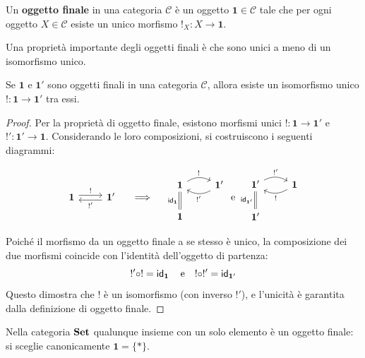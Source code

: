 \begin{definition}
  Un \textbf{oggetto finale} in una categoria \(\mathcal{C}\) è un oggetto \(\mathbf{1} \in \mathcal{C}\) tale che per ogni oggetto \(X \in \mathcal{C}\) esiste un unico morfismo \(!_X : X \to \mathbf{1}\).
\end{definition}

Una proprietà importante degli oggetti finali è che sono unici a meno di un isomorfismo unico.

\begin{proposition}
  Se \(\mathbf{1}\) e \(\mathbf{1'}\) sono oggetti finali in una categoria \(\mathcal{C}\), allora esiste un isomorfismo unico \(!: \mathbf{1} \to \mathbf{1'}\) tra essi.
\end{proposition}

\begin{proof}
  Per la proprietà di oggetto finale, esistono morfismi unici \(!: \mathbf{1} \to \mathbf{1'}\) e \(!': \mathbf{1'} \to \mathbf{1}\).
  Considerando le loro composizioni, si costruiscono i seguenti diagrammi:

  \[
    \begin{tikzcd}
      \mathbf{1} \arrow[r, "!", shift left] & \mathbf{1'} \arrow[l, "!'", shift left]
    \end{tikzcd}
    \quad \implies \quad
    \begin{tikzcd}
      \mathbf{1} \arrow[r, "!", bend left] \arrow[d, "\id_{\mathbf{1}}"', equal] & \mathbf{1'} \arrow[l, "!'", bend left] \\
      \mathbf{1} &
    \end{tikzcd}
    \text{ e }
    \begin{tikzcd}
      \mathbf{1'} \arrow[r, "!'", bend left] \arrow[d, "\id_{\mathbf{1'}}"', equal] & \mathbf{1} \arrow[l, "!", bend left] \\
      \mathbf{1'} &
    \end{tikzcd}
  \]

  Poiché il morfismo da un oggetto finale a se stesso è unico, la composizione dei due morfismi coincide con l'identità dell'oggetto di partenza:
  \[
    !' \circ ! = \operatorname{\operatorname{\mathsf{id}}}_{\mathbf{1}} \quad \text{e} \quad ! \circ !' = \operatorname{\operatorname{\mathsf{id}}}_{\mathbf{1'}}
  \]
  Questo dimostra che \(!\) è un isomorfismo (con inverso \(!'\)), e l'unicità è garantita dalla definizione di oggetto finale.
\end{proof}

\begin{example}
  Nella categoria \(\operatorname{\mathbf{Set}}\) qualunque insieme con un solo elemento è un oggetto finale: si sceglie canonicamente \(\mathbf{1} = \{*\}\).
\end{example}

